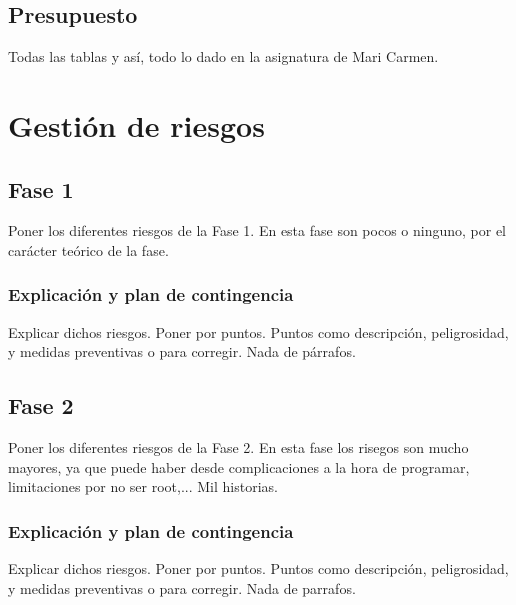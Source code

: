 \subsection{Presupuesto}
{\color{red} Todas las tablas y así, todo lo dado en la asignatura de Mari Carmen.}


\section{Gestión de riesgos}

\subsection{Fase 1}
{\color{red} Poner los diferentes riesgos de la Fase 1. En esta fase son pocos o ninguno, por el carácter teórico de la fase.}

\subsubsection{Explicación y plan de contingencia}
{\color{red} Explicar dichos riesgos. Poner por puntos. Puntos como descripción, peligrosidad, y medidas preventivas o para corregir. Nada de párrafos.}

\subsection{Fase 2}
{\color{red} Poner los diferentes riesgos de la Fase 2. En esta fase los risegos son mucho mayores, ya que puede haber desde complicaciones a la hora de programar, limitaciones por no ser root,... Mil historias.}

\subsubsection{Explicación y plan de contingencia}
{\color{red} Explicar dichos riesgos. Poner por puntos. Puntos como descripción, peligrosidad, y medidas preventivas o para corregir. Nada de parrafos.}

